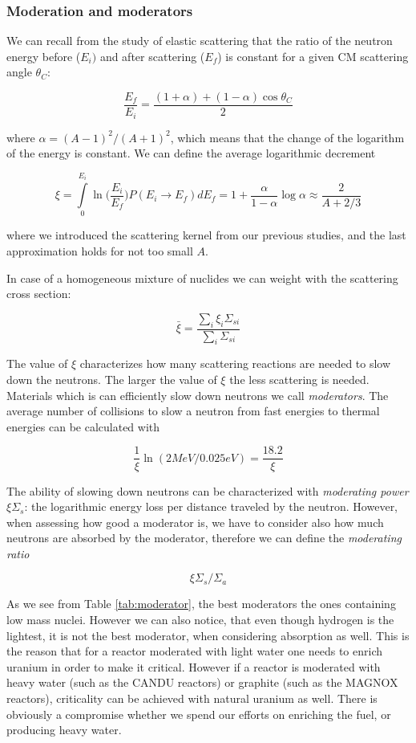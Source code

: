 \subsubsection{Moderation and moderators}

We can recall from the study of elastic scattering that the ratio of the neutron energy before ($E_i)$ and after scattering ($E_f$) is constant for a given CM scattering angle $\theta_C$:

\begin{equation}\label{eq:muErelation2}
\frac{E_f}{E_i}=\frac{(1+\alpha)+(1-\alpha)\cos\theta_C}{2}
\end{equation}

\noindent where $\alpha=(A-1)^2/(A+1)^2$, which means that the change of the logarithm of the energy is constant. We can define the average logarithmic decrement

\begin{equation}
\xi = \int\limits_0^{E_i}\ln\Big(\frac{E_i}{E_f}\Big)P(E_i\rightarrow E_f)dE_f=1+\frac{\alpha}{1-\alpha}\log\alpha \approx \frac{2}{A+2/3}
\end{equation}

\noindent where we introduced the scattering kernel from our previous studies, and the last approximation holds for not too small $A$.

In case of a homogeneous mixture of nuclides we can weight with the scattering cross section:

$$\bar\xi = \frac{\sum_i\xi_i\Sigma_{si}}{\sum_i\Sigma_{si}}$$

The value of $\xi$ characterizes how many scattering reactions are needed to slow down the neutrons. The larger the value of $\xi$ the less scattering is needed. Materials which is can efficiently slow down neutrons we call \textit{moderators}. The average number of collisions to slow a neutron from fast energies to thermal energies can be calculated with

$$\frac{1}{\xi}\ln(2 MeV/0.025 eV)=\frac{18.2}{\xi}$$

The ability of slowing down neutrons can be characterized with \textit{moderating power} $\xi\Sigma_s$: the logarithmic energy loss per distance traveled by the neutron. However, when assessing how good a moderator is, we have to consider also how much neutrons are absorbed by the moderator, therefore we can define the \textit{moderating ratio}

$$\xi\Sigma_s/\Sigma_a$$

\noindent As we see from Table \ref{tab:moderator}, the best moderators the ones containing low mass nuclei. However we can also notice, that even though hydrogen is the lightest, it is not the best moderator, when considering absorption as well. This is the reason that for a reactor moderated with light water one needs to enrich uranium in order to make it critical. However if a reactor is moderated with heavy water (such as the CANDU reactors) or graphite (such as the MAGNOX reactors), criticality can be achieved with natural uranium as well. There is obviously a compromise whether we spend our efforts on enriching the fuel, or producing heavy water. 


